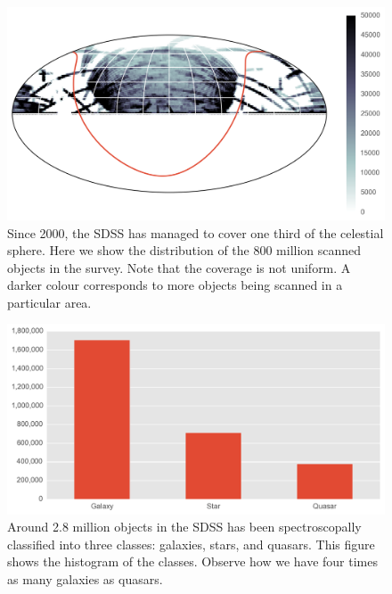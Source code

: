\begin{figure}[tbp]
	\centering
	\includegraphics[width=\textwidth]{figures/map_prediction_forest_all}
	\caption[The coverage of the SDSS]{Since 2000, the SDSS has managed to cover one third
		of the celestial sphere. Here we show the
		distribution of the 800 million scanned objects in the survey.
		 Note that the coverage is not uniform. A darker colour
		corresponds to more objects being scanned in a particular area.}
	\label{fig:coverage}
\end{figure}

\begin{figure}[tbp]
	\centering
	\includegraphics[width=\textwidth]{figures/bar_training_class_distribution}
	\caption[Histogram of the labelled objects in the SDSS]{Around 2.8 million
		objects in the SDSS has been spectroscopally classified into three classes: galaxies,
		stars, and quasars. This figure shows the histogram of the classes.
		Observe how we have four times as many galaxies as quasars.}
	\label{fig:class_dist_sdss}
\end{figure}


